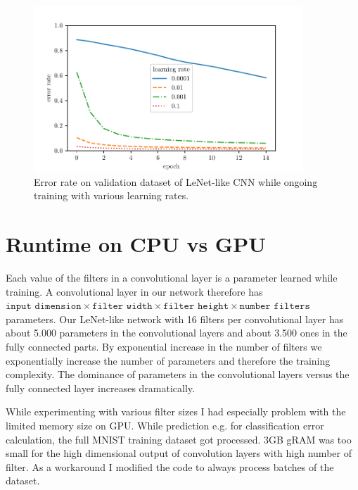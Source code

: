 \documentclass[a4paper,14pt]{article}
\begin{document}
\begin{figure}[ht]
  \centering \includegraphics[width=0.9\textwidth]{assets/error.pdf}
  \caption{
    \label{fig:error}
    Error rate on validation dataset of LeNet-like CNN while ongoing training
    with various learning rates.
  }
\end{figure}

\section{Runtime on CPU vs GPU}

Each value of the filters in a convolutional layer is a parameter learned while training.
A convolutional layer in our network therefore has
$\texttt{input dimension} \times \texttt{filter width} \times \texttt{filter
  height} \times \texttt{number filters}$ parameters.
Our LeNet-like network with 16 filters per convolutional layer has
about 5.000 parameters in the convolutional layers and about 3.500 ones in the
fully connected parts.
By exponential increase in the number of filters we
exponentially increase the number of parameters
and therefore the training complexity.
The dominance of parameters in the convolutional layers versus the fully
connected layer increases dramatically.

While experimenting with various filter sizes I had especially problem with
the limited memory size on GPU.
While prediction e.g. for classification error calculation,
the full MNIST training dataset got processed.
3GB gRAM was too small for the high dimensional output of convolution layers
with high number of filter.
As a workaround I modified the code to always process batches of the dataset.
\end{document}
